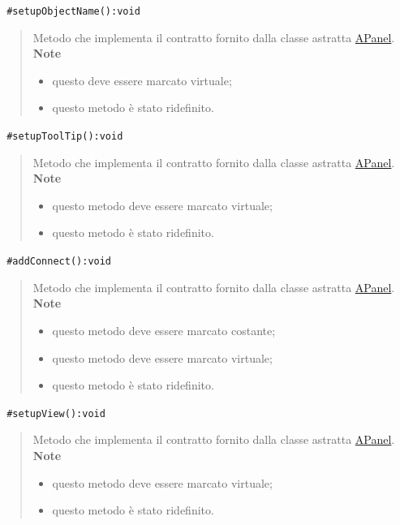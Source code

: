 \color{blue}\verb! #setupObjectName():void!
\begin{quote}
\color{black}Metodo che implementa il contratto fornito dalla classe astratta \hyperref[speAPanel]{APanel}.\\
 \textbf{Note}
 \begin{itemize}
  \item questo deve essere marcato virtuale;
 \item questo metodo è stato ridefinito.
 \end{itemize}
\end{quote} 
\color{blue}\verb! #setupToolTip():void!
\begin{quote}
\color{black}Metodo che implementa il contratto fornito dalla classe astratta \hyperref[speAPanel]{APanel}.\\
 \textbf{Note}
 \begin{itemize}
 \item questo metodo deve essere marcato virtuale;
 \item questo metodo è stato ridefinito.
 \end{itemize}
\end{quote} 
\color{blue}\verb! #addConnect():void!
\begin{quote}
\color{black}Metodo che implementa il contratto fornito dalla classe astratta \hyperref[speAPanel]{APanel}.\\
 \textbf{Note}
 \begin{itemize}
 \item questo metodo deve essere marcato costante;
 \item questo metodo deve essere marcato virtuale;
 \item questo metodo è stato ridefinito.
 \end{itemize}
\end{quote} 
\color{blue}\verb! #setupView():void!
\begin{quote}
\color{black}Metodo che implementa il contratto fornito dalla classe astratta \hyperref[speAPanel]{APanel}.\\
 \textbf{Note}
 \begin{itemize}
 \item questo metodo deve essere marcato virtuale;
 \item questo metodo è stato ridefinito.
 \end{itemize}
\end{quote}


